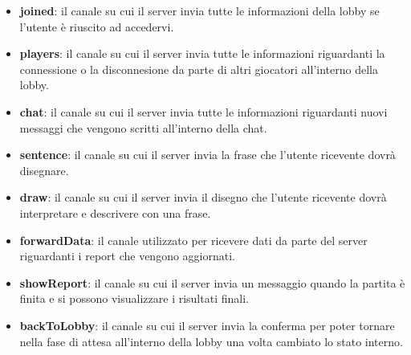 \begin{itemize}
    \item \textbf{joined}: il canale su cui il server invia tutte le informazioni della lobby se l'utente è riuscito ad accedervi.
    \item \textbf{players}: il canale su cui il server invia tutte le informazioni riguardanti la connessione o la disconnesione da parte di altri giocatori all'interno della lobby.
    \item \textbf{chat}: il canale su cui il server invia tutte le informazioni riguardanti nuovi messaggi che vengono scritti all'interno della chat.
    \item \textbf{sentence}: il canale su cui il server invia la frase che l'utente ricevente dovrà disegnare.
    \item \textbf{draw}: il canale su cui il server invia il disegno che l'utente ricevente dovrà interpretare e descrivere con una frase.
    \item \textbf{forwardData}: il canale utilizzato per ricevere dati da parte del server riguardanti i report che vengono aggiornati.
    \item \textbf{showReport}: il canale su cui il server invia un messaggio quando la partita è finita e si possono visualizzare i risultati finali.
    \item \textbf{backToLobby}: il canale su cui il server invia la conferma per poter tornare nella fase di attesa all'interno della lobby una volta cambiato lo stato interno.
\end{itemize}

